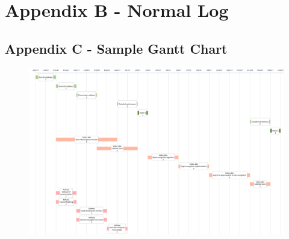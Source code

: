 \documentclass[a4paper,12pt]{article}
\begin{document}
\section*{Appendix B - Normal Log}
\begin{figure}[H]
    \centering
    
    \label{fig:veskolog}
\end{figure}
\begin{landscape}
\section*{Appendix C - Sample Gantt Chart}
\begin{figure}[H]
    \centering
    \includegraphics[scale=0.6]{gantt}
    \label{fig:ganttchart}
\end{figure}
\end{landscape}
\end{document}
